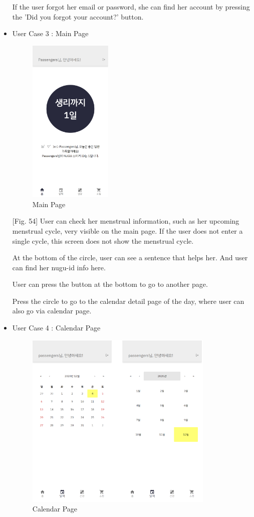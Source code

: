 \documentclass[conference]{IEEEtran}
\begin{document}
\begin{itemize}
    \setlength{\parindent}{2ex} If the user forgot her email or password, she can find her account by pressing the 'Did you forgot your account?' button.
    \item User Case 3 : Main Page
    \begin{figure}[ht]
    \includegraphics[width=4cm, center]{mainPnugu.png}
    \caption{Main Page}
    \label{fig54}
    \end{figure}
    [Fig. 54] User can check her menstrual information, such as her upcoming menstrual cycle, very visible on the main page. If the user does not enter a single cycle, this screen does not show the menstrual cycle.
    
   \setlength{\parindent}{2ex} At the bottom of the circle, user can see a sentence that helps her. And user can find her nugu-id info here. 
   
   \setlength{\parindent}{2ex} User can press the button at the bottom to go to another page.
    
    \setlength{\parindent}{2ex} Press the circle to go to the calendar detail page of the day, where user can also go via calendar page.
    \item User Case 4 : Calendar Page
    \begin{figure}[ht]
    \includegraphics[width=9cm, center]{usecalendar.PNG}
    \caption{Calendar Page}
    \label{fig55}
    \end{figure}
    

\end{itemize}
\end{document}
